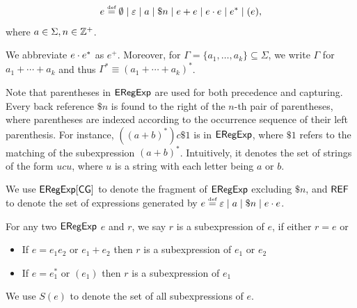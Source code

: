 \begin{definition}
  	\[e \eqdef \emptyset \mid \varepsilon \mid a \mid \$n \mid e + e \mid e \concat e \mid e^* \mid (e)  , \]
  	where $a \in \Sigma, n \in \mathbb{Z}^+$. 
\end{definition}
We abbreviate $e \cdot e^*$ as $e^+$. Moreover, for $\Gamma = \{a_1, \ldots, a_k\}\subseteq \Sigma$, we write $\Gamma$ for  $a_1 + \cdots + a_k$ and thus  $\Gamma^\ast \equiv (a_1 + \cdots + a_k)^\ast$. 

Note that parentheses in ${\sf ERegExp}$ are used for both precedence and capturing. 
%
Every back reference $\$ n$ is found to the right of the $n$-th pair of parentheses, where parentheses
are indexed according to the occurrence sequence of their left parenthesis. For instance, $((a+b)^*) c \$1$ is in ${\sf ERegExp}$, where $\$1$ refers to the matching of the subexpression $(a+b)^*$. Intuitively, it denotes the set of strings of the form $u c u$, where $u$ is a string with each letter being $a$ or $b$.
  
We use ${\sf ERegExp}[\sf CG]$ to denote the fragment of ${\sf ERegExp}$  excluding $\$ n$, and ${\sf REF}$ to denote the set of expressions generated by $e \eqdef \varepsilon \mid a \mid \$n \mid e \concat e$.
  
  
  
  
  
  \begin{definition}[Subexpression]
  	For any two ${\sf ERegExp}$ $e$ and $r$, we say $r$ is a subexpression of $e$,
  	if either $r=e$ or
  	\begin{itemize}
  		\item If $e = e_1 e_2$ or $e_1 + e_2$ then $r$ is a subexpression of $e_1$
  		or $e_2$
  		
  		\item If $e = e_1^{\ast}$ or $(e_1)$ then $r$ is a subexpression of $e_1$
  	\end{itemize}
  	We use $S (e)$ to denote the set of all subexpressions of $e$.
  \end{definition}

